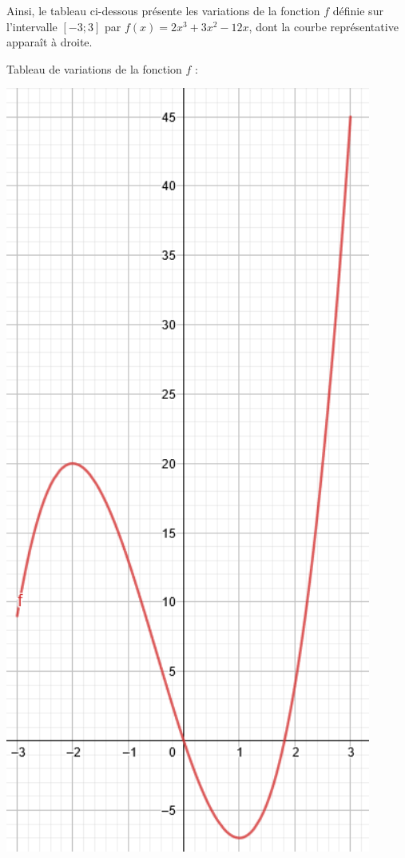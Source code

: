 \documentclass[10pt,a4paper,oneside]{book}
\begin{document}
\begin{minipage}{0.7\textwidth}
    Ainsi, le tableau ci-dessous présente les variations de la fonction $f$ définie sur l'intervalle $[-3;3]$ par $f(x)=2x^3+3x^2-12x$, dont la courbe représentative apparaît à droite.
    \newline
    
    \vspace{1 cm}
    Tableau de variations de la fonction $f$ : \newline
    
\end{minipage}
\begin{minipage}{0.25\textwidth}
    \centering
    \includegraphics[width=0.9\textwidth]{20221101_CourbeRepTabloVariation.PNG} 
\end{minipage}
\end{document}
